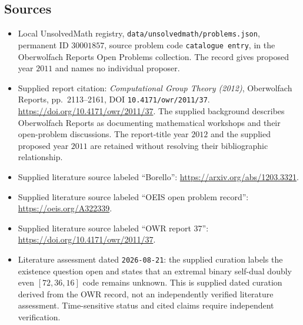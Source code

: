 \documentclass[11pt]{article}
\begin{document}
\subsection{Sources}
\begin{itemize}
\item Local UnsolvedMath registry, \texttt{data/unsolvedmath/problems.json}, permanent ID $30001857$, source problem code \texttt{catalogue entry}, in the Oberwolfach Reports Open Problems collection. The record gives proposed year $2011$ and names no individual proposer.
\item Supplied report citation: \emph{Computational Group Theory (2012)}, Oberwolfach Reports, pp.~2113--2161, DOI \texttt{10.4171/owr/2011/37}. \url{https://doi.org/10.4171/owr/2011/37}. The supplied background describes Oberwolfach Reports as documenting mathematical workshops and their open-problem discussions. The report-title year $2012$ and the supplied proposed year $2011$ are retained without resolving their bibliographic relationship.
\item Supplied literature source labeled ``Borello'': \url{https://arxiv.org/abs/1203.3321}.
\item Supplied literature source labeled ``OEIS open problem record'': \url{https://oeis.org/A322339}.
\item Supplied literature source labeled ``OWR report 37'': \url{https://doi.org/10.4171/owr/2011/37}.
\item Literature assessment dated \texttt{2026-08-21}: the supplied curation labels the existence question open and states that an extremal binary self-dual doubly even $[72,36,16]$ code remains unknown. This is supplied dated curation derived from the OWR record, not an independently verified literature assessment. Time-sensitive status and cited claims require independent verification.
\end{itemize}
\end{document}

